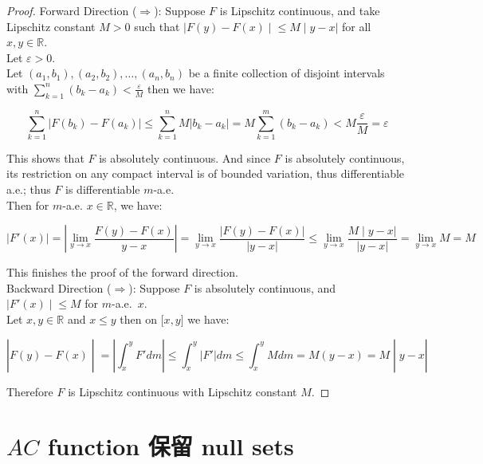 \begin{proof}

Forward Direction (\(\Longrightarrow\)): Suppose \(F\) is Lipschitz continuous, and take Lipschitz constant \(M > 0\) such that \(\left. |F(y) - F(x) \middle| \leq M \middle| y - x| \right.\) for all \(x,y \in \mathbb{R}\).\\
Let \(\varepsilon > 0\).\\
Let \(\left( {a_{1},b_{1}} \right),\left( {a_{2},b_{2}} \right),\ldots,\left( {a_{n},b_{n}} \right)\) be a finite collection of disjoint intervals with \(\sum_{k = 1}^{n}\left( {b_{k} - a_{k}} \right) < \frac{\varepsilon}{M}\) then we have:

\[\sum\limits_{k = 1}^{n}\left| {F\left( b_{k} \right) - F\left( a_{k} \right)} \right| \leq \sum\limits_{k = 1}^{n}M\left| {b_{k} - a_{k}} \right| = M\sum\limits_{k = 1}^{m}\left( {b_{k} - a_{k}} \right) < M\frac{\varepsilon}{M} = \varepsilon\]

This shows that \(F\) is absolutely continuous. And since \(F\) is absolutely continuous, its restriction on any compact interval is of bounded variation, thus differentiable a.e.; thus \(F\) is differentiable \(m\)-a.e.\\
Then for \(m\)-a.e. \(x \in \mathbb{R}\), we have:

\[\left| {F'(x)} \right| = \left| {\lim\limits_{y\rightarrow x}\frac{F(y) - F(x)}{y - x}} \right| = \lim\limits_{y\rightarrow x}\frac{|F(y) - F(x)|}{|y - x|} \leq \lim\limits_{y\rightarrow x}\frac{\left. M \middle| y - x| \right.}{|y - x|} = \lim\limits_{y\rightarrow x}M = M\]

This finishes the proof of the forward direction.\\
Backward Direction (\(\Longrightarrow\)): Suppose \(F\) is absolutely continuous, and \(\left. |F'(x) \middle| \leq M \right.\) for \(m\)-a.e.~\(x\).\\
Let \(x,y \in \mathbb{R}\) and \(x \leq y\) then on \(\lbrack x,y\rbrack\) we have:

\[\left. |F(y) - F(x) \middle| = \left| {\int_{x}^{y}F'dm} \right| \leq \int_{x}^{y}\left| F' \right|dm \leq \int_{x}^{y}Mdm = M(y - x) = M \middle| y - x| \right.\]

Therefore \(F\) is Lipschitz continuous with Lipschitz constant \(M\).

\end{proof}

\section{\texorpdfstring{\(AC\) function 保留 null sets}{AC function 保留 null sets}}\label{ac-function-ux4fddux7559-null-sets}

